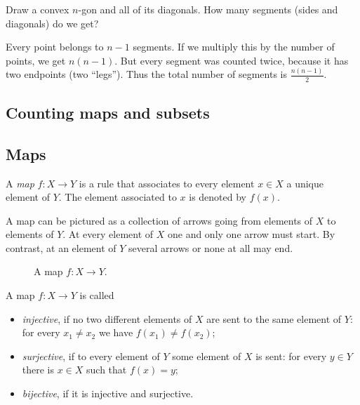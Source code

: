 \begin{page}

\begin{exl}
Draw a convex $n$-gon and all of its diagonals.
How many segments (sides and diagonals) do we get?

Every point belongs to $n-1$ segments.
If we multiply this by the number of points, we get $n(n-1)$.
But every segment was counted twice, because it has two endpoints (two ``legs'').
Thus the total number of segments is $\frac{n(n-1)}2$.
\end{exl}

\end{page}

\begin{page}

\section{Counting maps and subsets}
\subsection{Maps}
A \emph{map} $f \colon X \to Y$ is a rule that associates to every element $x \in X$ a unique element of $Y$.
The element associated to $x$ is denoted by $f(x)$.

A map can be pictured as a collection of arrows going from elements of $X$ to elements of $Y$.
At every element of $X$ one and only one arrow must start.
By contrast, at an element of $Y$ several arrows or none at all may end.

\begin{figure}[ht]
\begin{center}

\end{center}
\caption{A map $f \colon X \to Y$.}
\label{fig:Map}
\end{figure}

A map $f \colon X \to Y$ is called
\begin{itemize}
\item
\emph{injective}, if no two different elements of $X$ are sent to the same element of $Y$: for every $x_1 \ne x_2$ we have $f(x_1) \ne f(x_2)$;
\item
\emph{surjective}, if to every element of $Y$ some element of $X$ is sent: for every $y \in Y$ there is $x \in X$ such that $f(x) = y$;
\item
\emph{bijective}, if it is injective and surjective.
\end{itemize}


\end{page}

